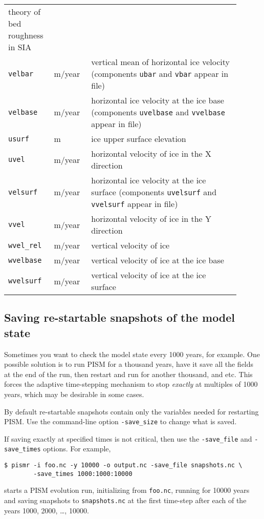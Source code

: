 \begin{center}
\begin{xtabular}{p{0.15\linewidth}p{0.15\linewidth}p{0.6\linewidth}}
    \cite{Schoofbasaltopg2003} theory
    of bed roughness in SIA \\
    \texttt{velbar} & m/year & vertical mean of horizontal ice velocity (components \texttt{ubar} and \texttt{vbar} appear in file) \\
    \texttt{velbase} & m/year & horizontal ice velocity at the ice base (components \texttt{uvelbase} and \texttt{vvelbase} appear in file) \\
    \texttt{usurf} & m & ice upper surface elevation \\
    \texttt{uvel} & m/year & horizontal velocity of ice in the X direction \\
   \texttt{velsurf} & m/year & horizontal ice velocity at the ice surface (components \texttt{uvelsurf} and \texttt{vvelsurf} appear in file) \\
   \texttt{vvel} & m/year & horizontal velocity of ice in the Y direction \\
    \texttt{wvel_rel} & m/year & vertical velocity of ice \\
    \texttt{wvelbase} & m/year &vertical velocity of ice at the ice base\\
    \texttt{wvelsurf} & m/year & vertical velocity of ice at the ice surface\\
  \end{xtabular}
\end{center}


\subsection{Saving re-startable snapshots of the model state}
\label{sec:snapshots}
Sometimes you want to check the model state every 1000 years, for example.  One possible solution is to run PISM for a thousand years, have it save all the fields at the end of the run, then restart and run for another thousand, and etc.  This forces the adaptive time-stepping mechanism to stop \emph{exactly} at multiples of 1000 years, which may be desirable in some cases.

By default re-startable snapshots contain only the variables needed for
restarting PISM. Use the command-line option \texttt{-save_size} to change what is saved.

If saving exactly at specified times is not critical, then use the \texttt{-save_file} and \texttt{-save_times} options.  For example,
\begin{verbatim}
$ pismr -i foo.nc -y 10000 -o output.nc -save_file snapshots.nc \
        -save_times 1000:1000:10000
\end{verbatim}
starts a PISM evolution run, initializing from \texttt{foo.nc}, running for
10000 years and saving snapshots to \texttt{snapshots.nc} at the first time-step
after each of the years 1000, 2000, \dots, 10000.

